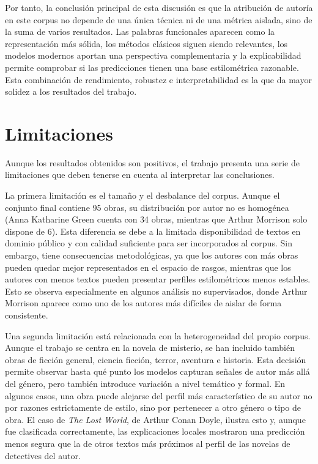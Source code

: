 \documentclass[IB]{TFUOC}%
\begin{document}
Por tanto, la conclusión principal de esta discusión es que la atribución de autoría en este corpus no depende de una única técnica ni de una métrica aislada, sino de la suma de varios resultados. Las palabras funcionales aparecen como la representación más sólida, los métodos clásicos siguen siendo relevantes, los modelos modernos aportan una perspectiva complementaria y la explicabilidad permite comprobar si las predicciones tienen una base estilométrica razonable. Esta combinación de rendimiento, robustez e interpretabilidad es la que da mayor solidez a los resultados del trabajo.

\section{Limitaciones}

Aunque los resultados obtenidos son positivos, el trabajo presenta una serie de limitaciones que deben tenerse en cuenta al interpretar las conclusiones.

La primera limitación es el tamaño y el desbalance del corpus. Aunque el conjunto final contiene 95 obras, su distribución por autor no es homogénea (Anna Katharine Green cuenta con 34 obras, mientras que Arthur Morrison solo dispone de 6). Esta diferencia se debe a la limitada disponibilidad de textos en dominio público y con calidad suficiente para ser incorporados al corpus. Sin embargo, tiene consecuencias metodológicas, ya que los autores con más obras pueden quedar mejor representados en el espacio de rasgos, mientras que los autores con menos textos pueden presentar perfiles estilométricos menos estables. Esto se observa especialmente en algunos análisis no supervisados, donde Arthur Morrison aparece como uno de los autores más difíciles de aislar de forma consistente.

Una segunda limitación está relacionada con la heterogeneidad del propio corpus. Aunque el trabajo se centra en la novela de misterio, se han incluido también obras de ficción general, ciencia ficción, terror, aventura e historia. Esta decisión permite observar hasta qué punto los modelos capturan señales de autor más allá del género, pero también introduce variación a nivel temático y formal. En algunos casos, una obra puede alejarse del perfil más característico de su autor no por razones estrictamente de estilo, sino por pertenecer a otro género o tipo de obra. El caso de \textit{The Lost World}, de Arthur Conan Doyle, ilustra esto y, aunque fue clasificada correctamente, las explicaciones locales mostraron una predicción menos segura que la de otros textos más próximos al perfil de las novelas de detectives del autor.
\end{document}
